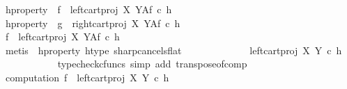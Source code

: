 \begin{isabellebody}
\ h{\isacharunderscore}{\kern0pt}property{}{\isacharcolon}{\kern0pt}\ \ {\isachardoublequoteopen}f\ {\isacharequal}{\kern0pt}\ {\isacharparenleft}{\kern0pt}{\isacharparenleft}{\kern0pt}left{\isacharunderscore}{\kern0pt}cart{\isacharunderscore}{\kern0pt}proj\ X\ Y{\isacharparenright}{\kern0pt}\isactrlbsup A\isactrlesup \isactrlsub f{\isacharparenright}{\kern0pt}\ {\isasymcirc}\isactrlsub c\ h{\isachardoublequoteclose}\isanewline
\ \ \ \ \ \ \ \ \isamarkupfalse%
\ h{\isacharunderscore}{\kern0pt}property{}{\isacharcolon}{\kern0pt}\ \ {\isachardoublequoteopen}g\ {\isacharequal}{\kern0pt}\ {\isacharparenleft}{\kern0pt}{\isacharparenleft}{\kern0pt}right{\isacharunderscore}{\kern0pt}cart{\isacharunderscore}{\kern0pt}proj\ X\ Y{\isacharparenright}{\kern0pt}\isactrlbsup A\isactrlesup \isactrlsub f{\isacharparenright}{\kern0pt}\ {\isasymcirc}\isactrlsub c\ h{\isachardoublequoteclose}\isanewline
\ \ \ \ \isanewline
\ \ \ \ \ \ \ \ \isamarkupfalse%
\ {\isachardoublequoteopen}f\ {\isacharequal}{\kern0pt}\ {\isacharparenleft}{\kern0pt}left{\isacharunderscore}{\kern0pt}cart{\isacharunderscore}{\kern0pt}proj\ X\ Y{\isacharparenright}{\kern0pt}\isactrlbsup A\isactrlesup \isactrlsub f\ {\isasymcirc}\isactrlsub c\ h\isactrlsup {\isasymflat}\isactrlsup {\isasymsharp}{\isachardoublequoteclose}\isanewline
\ \ \ \ \ \ \ \ \ \ \isamarkupfalse%
\ {\isacharparenleft}{\kern0pt}metis\ \ h{\isacharunderscore}{\kern0pt}property{}\ h{\isacharunderscore}{\kern0pt}type\ sharp{\isacharunderscore}{\kern0pt}cancels{\isacharunderscore}{\kern0pt}flat{\isacharparenright}{\kern0pt}\isanewline
\ \ \ \ \ \ \ \ \isamarkupfalse%
\ \isamarkupfalse%
\ {\isachardoublequoteopen}{\isachardot}{\kern0pt}{\isachardot}{\kern0pt}{\isachardot}{\kern0pt}\ {\isacharequal}{\kern0pt}\ {\isacharparenleft}{\kern0pt}{\isacharparenleft}{\kern0pt}left{\isacharunderscore}{\kern0pt}cart{\isacharunderscore}{\kern0pt}proj\ X\ Y{\isacharparenright}{\kern0pt}\ {\isasymcirc}\isactrlsub c\ h\isactrlsup {\isasymflat}{\isacharparenright}{\kern0pt}\isactrlsup {\isasymsharp}{\isachardoublequoteclose}\isanewline
\ \ \ \ \ \ \ \ \ \ \isamarkupfalse%
\ {\isacharparenleft}{\kern0pt}typecheck{\isacharunderscore}{\kern0pt}cfuncs{\isacharcomma}{\kern0pt}\ simp\ add{\isacharcolon}{\kern0pt}\ transpose{\isacharunderscore}{\kern0pt}of{\isacharunderscore}{\kern0pt}comp{\isacharparenright}{\kern0pt}\isanewline
\ \ \ \ \ \ \ \ \isamarkupfalse%
\ \isamarkupfalse%
\ computation{}{\isacharcolon}{\kern0pt}\ {\isachardoublequoteopen}f\ {\isacharequal}{\kern0pt}\ {\isacharparenleft}{\kern0pt}{\isacharparenleft}{\kern0pt}left{\isacharunderscore}{\kern0pt}cart{\isacharunderscore}{\kern0pt}proj\ X\ Y{\isacharparenright}{\kern0pt}\ {\isasymcirc}\isactrlsub c\ h\isactrlsup {\isasymflat}{\isacharparenright}{\kern0pt}\isactrlsup {\isasymsharp}{\isachardoublequoteclose}\isanewline

\end{isabellebody}
